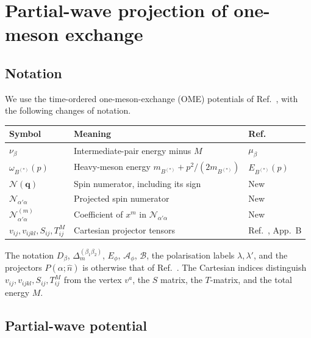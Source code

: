 \appendix
\section{Partial-wave projection of one-meson exchange}
\label{app:ome-projection}

\subsection{Notation}

We use the time-ordered one-meson-exchange (OME) potentials of
Ref.~\cite{Zhang:2026iyr}, with the following changes of notation.
\begin{center}
\begin{tabular}{@{}lll@{}}
\toprule
Symbol & Meaning & Ref.~\cite{Zhang:2026iyr}\\
\midrule
$\nu_\beta$ & Intermediate-pair energy minus $M$ & $\mu_\beta$\\
$\omega_{B^{(*)}}(p)$ & Heavy-meson energy $m_{B^{(*)}}+p^2/(2m_{B^{(*)}})$ & $E_{B^{(*)}}(p)$\\
$\mathcal N(\bm q)$ & Spin numerator, including its sign & New\\
$\mathcal N_{\alpha'\alpha}$ & Projected spin numerator & New\\
$\mathcal N^{(m)}_{\alpha'\alpha}$ & Coefficient of $x^m$ in $\mathcal N_{\alpha'\alpha}$ & New\\
$v_{ij},v_{ijkl},S_{ij},T^M_{ij}$ & Cartesian projector tensors & Ref.~\cite{Baru:2019xnh}, App.~B\\
\bottomrule
\end{tabular}
\end{center}
The notation $D_\beta$, $\Delta_m^{(\beta_1\beta_2)}$, $E_\phi$,
$\mathcal A_\phi$, $\mathcal B$, the polarisation labels $\lambda,\lambda'$,
and the projectors $P(\alpha;\hat n)$ is otherwise that of
Ref.~\cite{Zhang:2026iyr}.
The Cartesian indices distinguish $v_{ij},v_{ijkl},S_{ij},T^M_{ij}$ from
the vertex $v^a$, the $S$ matrix, the $T$-matrix, and the total energy $M$.

\subsection{Partial-wave potential}

